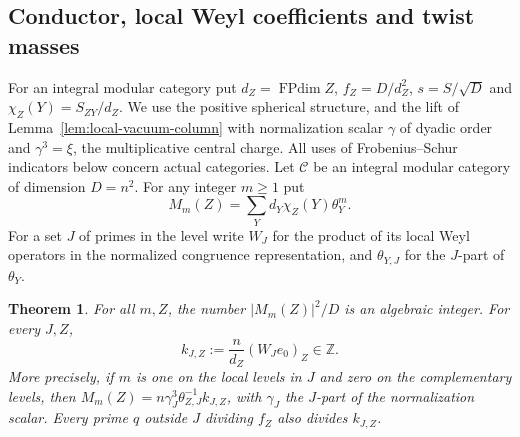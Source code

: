 \documentclass[11pt,a4paper]{article}
\numberwithin{equation}{section}
\newtheorem{theorem}{Theorem}[section]
\theoremstyle{remark}
\newcommand{\FPdim}{\operatorname{FPdim}}
\begin{document}
\subsection{Conductor, local Weyl coefficients and twist masses}
\label{por:tools}
For an integral modular category put $d_Z=\FPdim Z$, $f_Z=D/d_Z^2$, $s=S/\sqrt D$ and $\chi_Z(Y)=S_{ZY}/d_Z$. We use the positive spherical structure, and the lift of Lemma~\ref{lem:local-vacuum-column} with normalization scalar $\gamma$ of dyadic order and $\gamma^3=\xi$, the multiplicative central charge. All uses of Frobenius--Schur indicators below concern actual categories.
Let $\mathcal C$ be an integral modular category of dimension $D=n^2$. For any integer $m\ge1$ put
\[
             M_m(Z)=\sum_Y d_Y\chi_Z(Y)\theta_Y^m.
\]
For a set $J$ of primes in the level write $W_J$ for the product of its local Weyl operators in the normalized congruence representation, and $\theta_{Y,J}$ for the $J$-part of $\theta_Y$.
\begin{theorem}\label{por:th:weyl-div}
For all $m,Z$, the number $|M_m(Z)|^2/D$ is an algebraic integer. For every $J,Z$,
\[
             k_{J,Z}:=\frac n{d_Z}(W_J e_0)_Z\in\mathbb Z .
\]
More precisely, if $m$ is one on the local levels in $J$ and zero on the complementary levels, then $M_m(Z)=n\gamma_J^3\theta_{Z,J}^{-1}k_{J,Z}$, with $\gamma_J$ the $J$-part of the normalization scalar. Every prime $q$ outside $J$ dividing $f_Z$ also divides $k_{J,Z}$.
\end{theorem}
\end{document}
